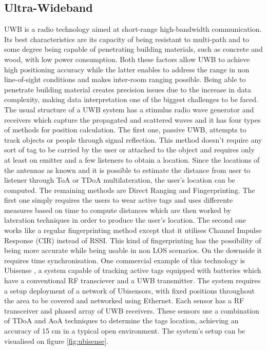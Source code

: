 \subsection{Ultra-Wideband}
\label{subsec:uwb}

\ac{UWB} is a radio technology aimed at short-range high-bandwidth communication. Its best characteristics are its capacity of being resistant to multi-path and to some degree being capable of penetrating building materials, such as concrete and wood, with low power consumption. Both these factors allow \ac{UWB} to achieve high positioning accuracy while the latter enables to address the range in non line-of-sight conditions and makes inter-room ranging possible. Being able to penetrate building material creates precision issues due to the increase in data complexity, making data interpretation one of the biggest challenges to be faced. The usual structure of a \ac{UWB} system has a stimulus radio wave generator and receivers which capture the propagated and scattered waves and it has four types of methods for position calculation.
The first one, passive \ac{UWB}, attempts to track objects or people through signal reflection. This method doesn't require any sort of tag to be carried by the user or attached to the object and requires only at least on emitter and a few listeners to obtain a location. Since the locations of the antennas as known and it is possible to estimate the distance from user to listener through \ac{ToA} or \ac{TDoA} multilateration, the user's location can be computed.
The remaining methods are Direct Ranging and Fingerprinting. The first one simply requires the users to wear active tags and uses differente measures based on time to compute distances which are then worked by lateration techniques in order to produce the user's location. The second one works like a regular fingerprinting method except that it utilises Channel Impulse Response (CIR) instead of \ac{RSSI}. This kind of fingerprinting has the possibility of being more accurate while being usable in non \ac{LOS} scenarios. On the downside it requires time synchronisation.
One commercial example of this technology is Ubisense \cite{ubisense}, a system capable of tracking active tags equipped with batteries which have a conventional RF transciever and a \ac{UWB} transmitter. The system requires a setup deployment of a network of Ubisensors, with fixed positions throughout the area to be covered and networked using Ethernet. Each sensor has a RF transceiver and  phased array of \ac{UWB} receivers. These sensors use a combination of \ac{TDoA} and \ac{AoA} techniques to determine the tags location, achieving an accuracy of 15 cm in a typical open environment. The system's setup can be visualised on figure \ref{fig:ubisense}.


